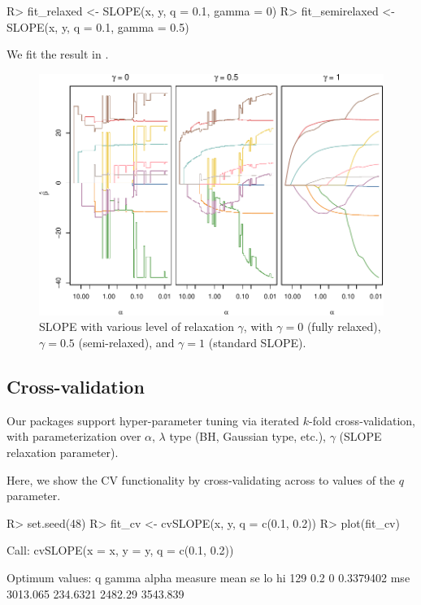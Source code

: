 \documentclass[article]{jss}
\makeatletter
\let\Cref\crtCref
\let\natwidth\Gin@nat@width
\makeatother
\begin{document}
\begin{Code}
R> fit_relaxed <- SLOPE(x, y, q = 0.1, gamma = 0)
R> fit_semirelaxed <- SLOPE(x, y, q = 0.1, gamma = 0.5)
\end{Code}

We fit the result in \Cref{fig:relaxed-slope}.

\begin{figure}[tp]
  \centering
  \includegraphics[width=\natwidth]{images/slope-relaxed.pdf}
  \caption{%
    SLOPE with various level of relaxation \(\gamma\), with
    \(\gamma = 0\) (fully relaxed), \(\gamma = 0.5\) (semi-relaxed),
    and \(\gamma = 1\) (standard SLOPE).
  }
  \label{fig:relaxed-slope}
\end{figure}

\subsection{Cross-validation}

Our packages support hyper-parameter tuning via iterated \(k\)-fold
cross-validation, with parameterization over \(\alpha\), \(\lambda\) type (BH,
Gaussian type, etc.), \(\gamma\) (SLOPE relaxation parameter).

Here, we show the CV functionality by cross-validating across
to values of the \(q\) parameter.

\begin{CodeChunk}
  \begin{CodeInput}
R> set.seed(48)
R> fit_cv <- cvSLOPE(x, y, q = c(0.1, 0.2))
R> plot(fit_cv)
\end{CodeInput}
  \begin{CodeOutput}
Call:
cvSLOPE(x = x, y = y, q = c(0.1, 0.2))

Optimum values:
      q gamma     alpha measure     mean       se      lo       hi
129 0.2     0 0.3379402     mse 3013.065 234.6321 2482.29 3543.839
\end{CodeOutput}
\end{CodeChunk}
\end{document}
